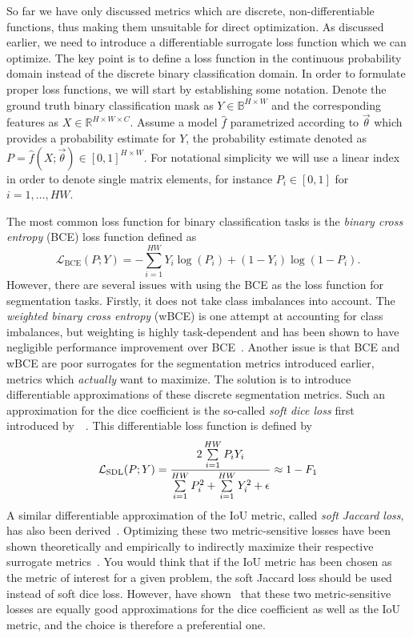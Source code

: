 So far we have only discussed metrics which are discrete, non-differentiable functions, thus making them unsuitable for direct optimization.
As discussed earlier, we need to introduce a differentiable surrogate loss function which we can optimize.
The key point is to define a loss function in the continuous probability domain instead of the discrete binary classification domain.
In order to formulate proper loss functions, we will start by establishing some notation.
Denote the ground truth binary classification mask as $Y \in \mathbb{B}^{H \times W}$ and the corresponding features as $X \in \mathbb{R}^{H \times W \times C}$.
Assume a model $\hat{f}$ parametrized according to $\vec{\theta}$ which provides a probability estimate for $Y$, the probability estimate denoted as $P = \hat{f}(X; \vec{\theta}) \in [0, 1]^{H \times W}$.
For notational simplicity we will use a linear index in order to denote single matrix elements, for instance $P_i \in [0, 1]$ for $i = 1, \ldots, HW$.

The most common loss function for binary classification tasks is the \textit{binary cross entropy} (BCE) loss function defined as
%
\begin{equation*}
  \mathcal{L}_{\mathrm{BCE}}(P; Y)
  =
  - \sum\limits_{i = 1}^{HW}
  Y_i \log{(P_i)}
  +
  (1 - Y_i) \log{(1 - P_i)}.
\end{equation*}
%
However, there are several issues with using the BCE as the loss function for segmentation tasks.
Firstly, it does not take class imbalances into account.
The \textit{weighted binary cross entropy} (wBCE) is one attempt at accounting for class imbalances, but weighting is highly task-dependent and has been shown to have negligible performance improvement over BCE~\cite[p.~98]{soft-losses}.
Another issue is that BCE and wBCE are poor surrogates for the segmentation metrics introduced earlier, metrics which \textit{actually} want to maximize.
The solution is to introduce differentiable approximations of these discrete segmentation metrics.
Such an approximation for the dice coefficient is the so-called \textit{soft dice loss} first introduced by~\citeauthor{original-soft-dice-loss}~\cite{original-soft-dice-loss}.
This differentiable loss function is defined by
%
\begin{equation*}
  \mathcal{L}_{\mathrm{SDL}}(P; Y)
  =
  \frac{%
    2 \sum\limits_{i = 1}^{HW}
    P_i Y_i
  }{%
    \sum\limits_{i = 1}^{HW} P_i^2
    +
    \sum\limits_{i = 1}^{HW}  Y_i^2
    +
    \epsilon
  }
  \approx
  1 - F_1
\end{equation*}
%
A similar differentiable approximation of the IoU metric, called \textit{soft Jaccard loss}, has also been derived~\cite{soft-jacard-loss}.
Optimizing these two metric-sensitive losses have been shown theoretically and empirically to indirectly maximize their respective surrogate metrics~\cite{soft-losses}.
You would think that if the IoU metric has been chosen as the metric of interest for a given problem, the soft Jaccard loss should be used instead of soft dice loss.
However, \citeauthor{soft-losses} have shown~\cite{soft-losses} that these two metric-sensitive losses are equally good approximations for the dice coefficient as well as the IoU metric, and the choice is therefore a preferential one.
